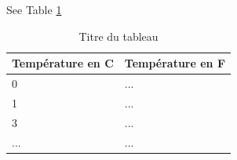See Table \ref{tab:tableau1}

\begin{table}[h!]
\begin{center}
	\begin{tabular}{|l|l|}
		\hline
		\textbf{Température en C} & \textbf{Température en F} \\
		\hline
		\hline
		0 & ... \\
		\hline
		1 & ... \\
		\hline
		3 & ... \\
		\hline
		... & ... \\
		\hline
	\end{tabular}
\end{center}
\caption{Titre du tableau}
\label{tab:tableau1}
\end{table}

